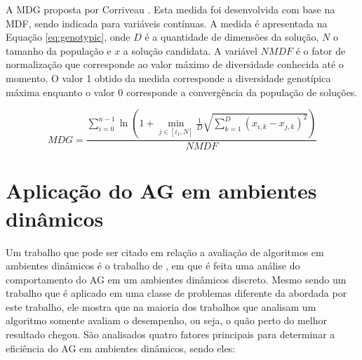 A MDG  proposta por Corriveau \cite{genotypic}. Esta medida foi desenvolvida com base na MDF, sendo indicada para variáveis contínuas. A medida é apresentada na Equação \ref{eq:genotypic}, onde $D$ é a quantidade de dimensões da solução, $N$ o tamanho da população e $x$ a solução candidata. A variável
$NMDF$ é o fator de normalização que corresponde ao valor máximo de diversidade conhecida até o momento. O valor 1 obtido da medida corresponde a diversidade genotípica máxima enquanto o valor 0 corresponde a convergência da população de soluções.

\begin{equation}
\label{eq:genotypic}
MDG = \frac{\sum_{i=0}^{n-1} \ln \left(1 + \min_{j \in [i_1,N]} \frac{1}{D} \sqrt{ \sum\limits_{k=1}^{D} (x_{i,k} - x_{j,k})^2}\right)}{NMDF}
\end{equation}

\section{Aplicação do AG em ambientes dinâmicos}
\label{sec:ag_behaviour}

Um trabalho que pode ser citado em relação a avaliação de algoritmos em ambientes dinâmicos é o trabalho de \cite{rand2005measurements}, em que é feita uma análise do comportamento do AG em um ambientes dinâmicos discreto. Mesmo sendo um trabalho que é aplicado em uma classe de problemas diferente da abordada por este trabalho, ele mostra que na maioria dos trabalhos que analisam um algoritmo somente avaliam o desempenho, ou seja, o quão perto do melhor resultado chegou. São analisados quatro fatores principais para determinar a eficiência do AG em ambientes dinâmicos, sendo eles:

